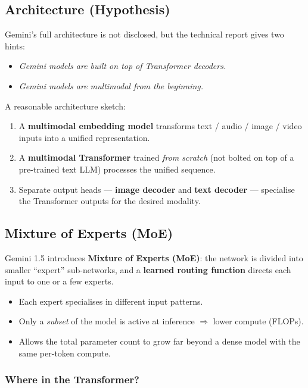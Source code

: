 \documentclass[11pt,a4paper]{article}
\theoremstyle{definition}
\theoremstyle{plain}
\theoremstyle{remark}
\begin{document}
\subsection{Architecture (Hypothesis)}

Gemini's full architecture is not disclosed, but the technical report gives two hints:
\begin{itemize}
    \item \emph{Gemini models are built on top of Transformer decoders.}
    \item \emph{Gemini models are multimodal from the beginning.}
\end{itemize}

A reasonable architecture sketch:
\begin{enumerate}
    \item A \textbf{multimodal embedding model} transforms text / audio / image / video inputs into a unified representation.
    \item A \textbf{multimodal Transformer} trained \emph{from scratch} (not bolted on top of a pre-trained text LLM) processes the unified sequence.
    \item Separate output heads --- \textbf{image decoder} and \textbf{text decoder} --- specialise the Transformer outputs for the desired modality.
\end{enumerate}

\subsection{Mixture of Experts (MoE)}

Gemini 1.5 introduces \textbf{Mixture of Experts (MoE)}: the network is divided into smaller ``expert'' sub-networks, and a \textbf{learned routing function} directs each input to one or a few experts.

\begin{itemize}
    \item Each expert specialises in different input patterns.
    \item Only a \emph{subset} of the model is active at inference $\Rightarrow$ lower compute (FLOPs).
    \item Allows the total parameter count to grow far beyond a dense model with the same per-token compute.
\end{itemize}

\subsubsection{Where in the Transformer?}
\end{document}
